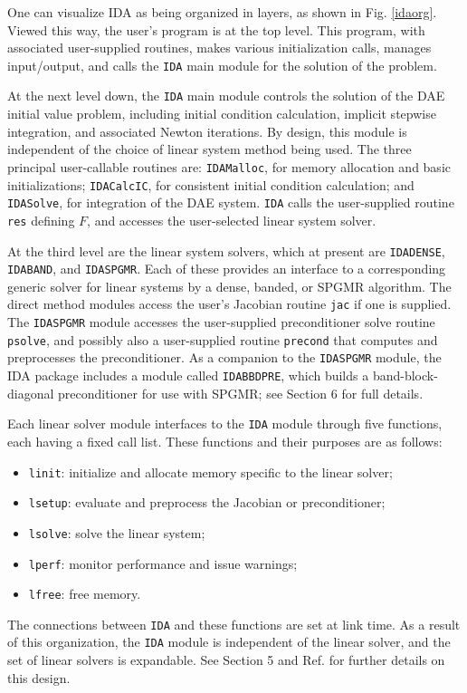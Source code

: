 One can visualize IDA as being organized in layers, as shown in
Fig. \ref{idaorg}.  Viewed this way, the user's program is at the top
level.  This program, with associated user-supplied routines, makes
various initialization calls, manages input/output, and calls the 
{\tt IDA} main module for the solution of the problem.

At the next level down, the {\tt IDA} main module controls the
solution of the DAE initial value problem, including initial condition
calculation, implicit stepwise integration, and associated Newton
iterations.  By design, this module is independent of the choice of
linear system method being used.  The three principal user-callable
routines are: {\tt IDAMalloc}, for memory allocation and basic
initializations; {\tt IDACalcIC}, for consistent initial condition
calculation; and {\tt IDASolve}, for integration of the DAE system.
{\tt IDA} calls the user-supplied routine {\tt res} defining $F$,
and accesses the user-selected linear system solver.

At the third level are the linear system solvers, which at present are
{\tt IDADENSE}, {\tt IDABAND}, and {\tt IDASPGMR}.  Each of these
provides an interface to a corresponding generic solver for linear
systems by a dense, banded, or SPGMR algorithm.  The direct method
modules access the user's Jacobian routine {\tt jac} if one is
supplied.  The {\tt IDASPGMR} module accesses the user-supplied
preconditioner solve routine {\tt psolve}, and possibly also a
user-supplied routine {\tt precond} that computes and preprocesses the
preconditioner.  As a companion to the {\tt IDASPGMR} module, the IDA
package includes a module called {\tt IDABBDPRE}, which builds a
band-block-diagonal preconditioner for use with SPGMR; see Section 6
for full details.

Each linear solver module interfaces to the {\tt IDA} module through
five functions, each having a fixed call list.  These functions and
their purposes are as follows:
\begin{itemize}
\item {\tt linit}: initialize and allocate memory specific to the
linear solver;
\item {\tt lsetup}: evaluate and preprocess the Jacobian or preconditioner;
\item {\tt lsolve}: solve the linear system;
\item {\tt lperf}: monitor performance and issue warnings;
\item {\tt lfree}: free memory.
\end{itemize}
The connections between {\tt IDA} and these functions are set at link time.
As a result of this organization, the {\tt IDA} module is independent
of the linear solver, and the set of linear solvers is expandable.
See Section 5 and Ref. \cite{CoHi96} for further details on this design.

